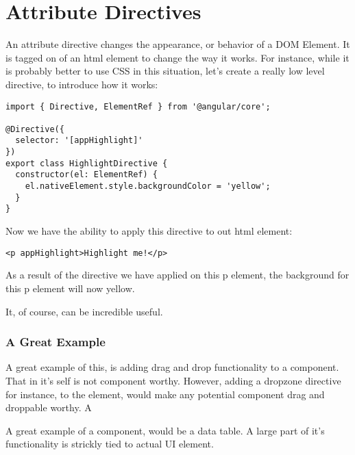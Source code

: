 \section{ Attribute Directives }
\maketitle{}

An attribute directive changes the appearance, or behavior of a DOM Element.
It is tagged on of an html element to change the way it works. For instance,
while it is probably better to use CSS in this situation, let's create a
really low level directive, to introduce how it works:
\begin{lstlisting}
import { Directive, ElementRef } from '@angular/core';

@Directive({
  selector: '[appHighlight]'
})
export class HighlightDirective {
  constructor(el: ElementRef) {
    el.nativeElement.style.backgroundColor = 'yellow';
  }
}
\end{lstlisting}

Now we have the ability to apply this directive to out html element:
\begin{lstlisting}
<p appHighlight>Highlight me!</p>
\end{lstlisting}

As a result of the directive we have applied on this p element, the background
for this p element will now yellow.

It, of course, can be incredible useful.


\subsubsection{A Great Example}
A great example of this, is adding drag and drop functionality to a component.
That in it's self is not component worthy. However, adding a dropzone directive
for instance, to the element, would make any potential component drag and
droppable worthy. A

A great example of a component, would be a data table. A large part of it's
functionality is strickly tied to actual UI element.



